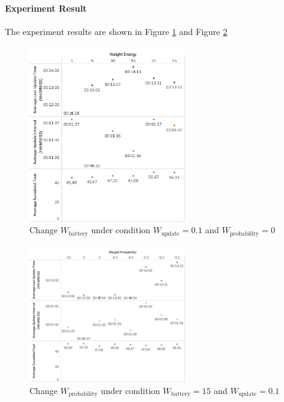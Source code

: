 \paragraph{Experiment Result} The experiment results are shown in Figure \ref{fig:gather_info_experiment_two_value} and Figure \ref{fig:gather_info_experiment_three_value}
\begin{figure}
 \centering
 \includegraphics[width = 0.6\textwidth]{content/images/ch5/gather_info_change_weight_energy_only.png}
 \caption{Change $W_{\mbox{battery}}$ under condition $W_{\mbox{update}} = 0.1$ and $W_{\mbox{probability}}=0$}
 \label{fig:gather_info_experiment_two_value}
\end{figure}

\begin{figure}
 \centering
 \includegraphics[width = 0.6\textwidth]{content/images/ch5/gather_info_change_weight_probability_only.png}
 \caption{Change $W_{\mbox{probability}}$ under condition $W_{\mbox{battery}}=15$ and $ W_{\mbox{update}}=0.1$}
 \label{fig:gather_info_experiment_three_value}
\end{figure}

